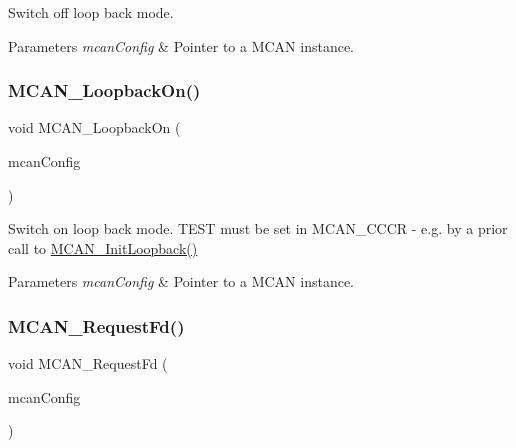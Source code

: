 Switch off loop back mode. 


\begin{DoxyParams}{Parameters}
{\em mcan\+Config} & Pointer to a M\+C\+AN instance. \\
\hline
\end{DoxyParams}
\mbox{\label{group__can__module_gac00448534ba8dbcf25329259d2312c10}} 
\subsubsection{\texorpdfstring{MCAN\_LoopbackOn()}{MCAN\_LoopbackOn()}}
{\footnotesize\ttfamily void M\+C\+A\+N\+\_\+\+Loopback\+On (\begin{DoxyParamCaption}\item[{const \mbox{\hyperlink{structMCan__ConfigTag}{M\+Can\+\_\+\+Config\+Type}} $\ast$}]{mcan\+Config }\end{DoxyParamCaption})}



Switch on loop back mode. T\+E\+ST must be set in M\+C\+A\+N\+\_\+\+C\+C\+CR -\/ e.\+g. by a prior call to \mbox{\hyperlink{group__can__module_ga97adc21dfdf714818018ae78b51bf02e}{M\+C\+A\+N\+\_\+\+Init\+Loopback()}} 


\begin{DoxyParams}{Parameters}
{\em mcan\+Config} & Pointer to a M\+C\+AN instance. \\
\hline
\end{DoxyParams}
\mbox{\label{group__can__module_ga3cab9ee5985894d07f48d0d5edee6ab4}} 
\subsubsection{\texorpdfstring{MCAN\_RequestFd()}{MCAN\_RequestFd()}}
{\footnotesize\ttfamily void M\+C\+A\+N\+\_\+\+Request\+Fd (\begin{DoxyParamCaption}\item[{const \mbox{\hyperlink{structMCan__ConfigTag}{M\+Can\+\_\+\+Config\+Type}} $\ast$}]{mcan\+Config }\end{DoxyParamCaption})}



